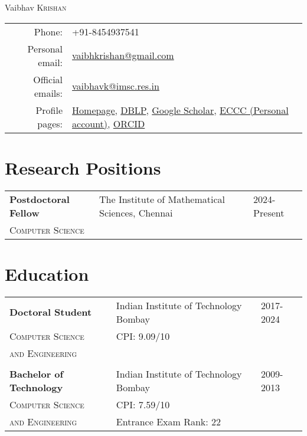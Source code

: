 \documentclass[a4paper,10pt]{article}
\begin{document}
\par{\centering
{\Huge Vaibhav \textsc{Krishan}
}\bigskip\par}

\begin{tabular}{rl}
  Phone: & +91-8454937541 \\
  Personal email: & \href{mailto:vaibhkrishan@gmail.com}{vaibhkrishan@gmail.com} \\ 
  Official emails: & \href{mailto:vaibhavk@imsc.res.in}{vaibhavk@imsc.res.in}\\
  Profile pages: & \href{https://vaibhkrishan.github.io}{Homepage}, 
  \href{https://dblp.org/pid/187/8296.html}{DBLP},
  \href{https://scholar.google.com/citations?user=dVMC44EAAAAJ&hl=en}{Google Scholar},
  \href{https://eccc.weizmann.ac.il/author/1412/">ECCC (IIT Bombay account)</a>, <a href="https://eccc.weizmann.ac.il/author/985/}{ECCC (Personal account)},
  \href{https://orcid.org/0009-0000-0335-1963}{ORCID}
\end{tabular}

\section{Research Positions}

\begin{tabular}{lll}
  {\bf Postdoctoral Fellow} & The Institute of Mathematical Sciences, Chennai & 2024-Present \\
  \textsc{Computer Science} &  & 
\end{tabular}

\section{Education}

\begin{tabular}{lll}
  {\bf Doctoral Student} & Indian Institute of Technology Bombay & 2017-2024 \\
  \textsc{Computer Science} & CPI: 9.09/10 & \\
  \textsc{and Engineering} \\
  \\
  {\bf Bachelor of Technology} & Indian Institute of Technology Bombay & 2009-2013 \\
  \textsc{Computer Science} & CPI: 7.59/10 & \\
  \textsc{and Engineering} & Entrance Exam Rank: 22 & \\
\end{tabular}
\end{document}
